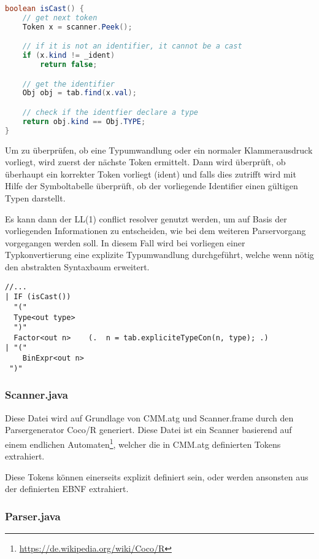 \begin{lstlisting}[language=Java]
boolean isCast() {
	// get next token
	Token x = scanner.Peek();

	// if it is not an identifier, it cannot be a cast
	if (x.kind != _ident) 
		return false;

	// get the identifier
	Obj obj = tab.find(x.val);

	// check if the identfier declare a type
	return obj.kind == Obj.TYPE;
}
\end{lstlisting}

Um zu \"uberpr\"ufen, ob eine Typumwandlung oder ein normaler Klammerausdruck vorliegt, wird zuerst der n\"achste Token ermittelt. Dann wird \"uberpr\"uft, ob \"uberhaupt ein korrekter Token vorliegt (ident) und falls dies zutrifft wird mit Hilfe der Symboltabelle \"uberpr\"uft, ob der vorliegende Identifier einen g\"ultigen Typen darstellt.

Es kann dann der LL(1) conflict resolver genutzt werden, um auf Basis der vorliegenden Informationen zu entscheiden, wie bei dem weiteren Parservorgang vorgegangen werden soll. In diesem Fall wird bei vorliegen einer Typkonvertierung eine explizite Typumwandlung durchgef\"uhrt, welche wenn n\"otig den abstrakten Syntaxbaum erweitert.

\begin{lstlisting}[language=EBNF]
//...
| IF (isCast())                        
  "(" 
  Type<out type>
  ")"
  Factor<out n>    (.  n = tab.expliciteTypeCon(n, type); .)
| "("
    BinExpr<out n>
 ")"
\end{lstlisting}

\subsubsection{Scanner.java}

Diese Datei wird auf Grundlage von CMM.atg und Scanner.frame durch den Parsergenerator Coco/R generiert. Diese Datei ist ein Scanner basierend auf einem endlichen Automaten\footnote{\url{https://de.wikipedia.org/wiki/Coco/R}}, welcher die in CMM.atg definierten Tokens extrahiert.

Diese Tokens k\"onnen einerseits explizit definiert sein, oder werden ansonsten aus der definierten EBNF extrahiert.

\subsubsection{Parser.java}

